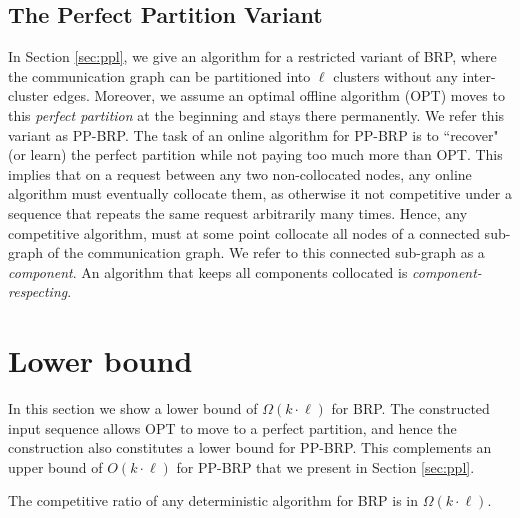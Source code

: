 \documentclass[manuscript,screen=true]{acmart}
\newcommand{\OBRP}{BRP}
\newcommand{\PPOBRP}{PP-BRP}
\begin{document}
\subsection{The Perfect Partition Variant}	\label{sec:PP}
In Section \ref{sec:ppl},
we give an algorithm for a restricted variant of  \OBRP{},
where the communication graph can be partitioned into $\ell$ clusters without any inter-cluster edges.
Moreover, we assume an optimal offline algorithm (OPT) moves to this \emph{perfect partition}
at the beginning and stays there permanently.
We refer this variant as \PPOBRP{}.
The task of an online algorithm for \PPOBRP{} is to ``recover" (or learn) the perfect partition while not paying too much more than OPT.
This implies that on a request between any two non-collocated nodes,
any online algorithm must eventually collocate them,
as otherwise it not competitive under a sequence that repeats the same request arbitrarily many times.
Hence,
any competitive algorithm,
must at some point collocate all nodes of a  connected sub-graph of the communication graph.
We refer to this connected sub-graph as a \emph{component}.
An algorithm that  keeps all components collocated is \emph{component-respecting}.

\section{Lower bound} %
\label{sec:lowerbound}

In this section we show a lower bound of $\Omega(k \cdot \ell)$ for \OBRP{}.
The constructed input sequence allows OPT to move to a perfect partition, and hence
the construction also constitutes a lower bound for \PPOBRP{}.
This complements an upper bound of $O(k \cdot \ell)$
for \PPOBRP{} that we present in Section \ref{sec:ppl}.

\begin{theorem}
	The competitive ratio of any deterministic algorithm for \OBRP{} is in $\Omega(k\cdot \ell)$.
\end{theorem}
\end{document}
